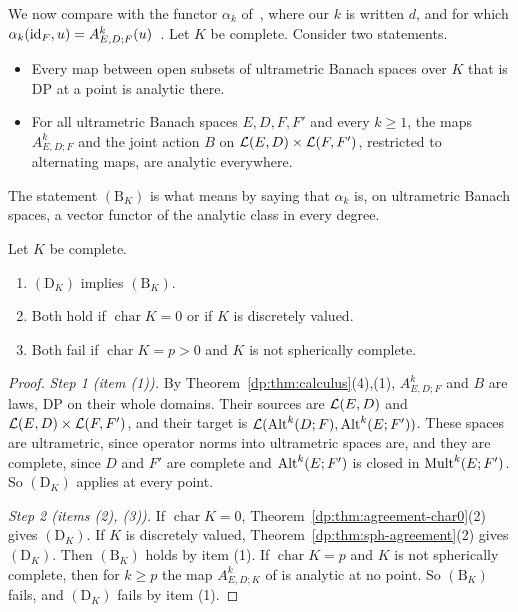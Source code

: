We now compare with the functor $\alpha_k$ of~\cite[n\textsuperscript{o}~7.8.1]{Bou}, where our $k$ is written $d$, and for which $\alpha_k(\mathrm{id}_F,u)=A^k_{E,D;F}(u)$~\cite[Section~10.2]{I}. Let $K$ be complete. Consider two statements.
\begin{itemize}
\item[$(\mathrm D_K)$] Every map between open subsets of ultrametric Banach spaces over $K$ that is DP at a point is analytic there.
\item[$(\mathrm B_K)$] For all ultrametric Banach spaces $E,D,F,F'$ and every $k\ge1$, the maps $A^k_{E,D;F}$ and the joint action $B$ on $\mathcal L(E,D)\times\mathcal L(F,F')$, restricted to alternating maps, are analytic everywhere.
\end{itemize}
The statement $(\mathrm B_K)$ is what \cite[paragraph \emph{Bourbaki's question}, and the proof of Corollary~10.5]{I} means by saying that $\alpha_k$ is, on ultrametric Banach spaces, a vector functor of the analytic class in every degree.

\begin{theorem}\label{dp:thm:field-level}
Let $K$ be complete.
\begin{enumerate}
\item $(\mathrm D_K)$ implies $(\mathrm B_K)$.
\item Both hold if $\operatorname{char}K=0$ or if $K$ is discretely valued.
\item Both fail if $\operatorname{char}K=p>0$ and $K$ is not spherically complete.
\end{enumerate}
\end{theorem}

\begin{proof}
\emph{Step 1 (item (1)).} By Theorem~\ref{dp:thm:calculus}(4),(1), $A^k_{E,D;F}$ and $B$ are laws, DP on their whole domains. Their sources are $\mathcal L(E,D)$ and $\mathcal L(E,D)\times\mathcal L(F,F')$, and their target is $\mathcal L(\operatorname{Alt}^k(D;F),\operatorname{Alt}^k(E;F'))$. These spaces are ultrametric, since operator norms into ultrametric spaces are, and they are complete, since $D$ and $F'$ are complete and $\operatorname{Alt}^k(E;F')$ is closed in $\operatorname{Mult}^k(E;F')$. So $(\mathrm D_K)$ applies at every point.

\emph{Step 2 (items (2), (3)).} If $\operatorname{char}K=0$, Theorem~\ref{dp:thm:agreement-char0}(2) gives $(\mathrm D_K)$. If $K$ is discretely valued, Theorem~\ref{dp:thm:sph-agreement}(2) gives $(\mathrm D_K)$. Then $(\mathrm B_K)$ holds by item (1). If $\operatorname{char}K=p$ and $K$ is not spherically complete, then for $k\ge p$ the map $A^k_{E,D;K}$ of \cite[Theorem~7.2(2)]{I} is analytic at no point. So $(\mathrm B_K)$ fails, and $(\mathrm D_K)$ fails by item (1).
\end{proof}

